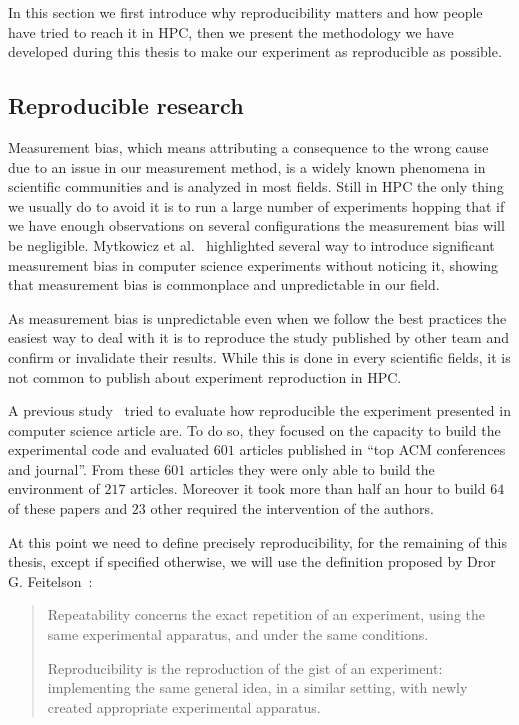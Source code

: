 In this section we first introduce why reproducibility matters and how people have tried to reach it in \gls{HPC}, then we present the methodology we have developed during this thesis to make our experiment as reproducible as possible.


\subsection{Reproducible research}

Measurement bias, which means attributing a consequence to the wrong cause due to an issue in our measurement method, is a widely known phenomena in scientific communities and is analyzed in most fields.
Still in \gls{HPC} the only thing we usually do to avoid it is to run a large number of experiments hopping that if we have enough observations on several configurations the measurement bias will be negligible.
Mytkowicz et al.~\cite{Mytkowicz09Producing} highlighted several way to introduce significant measurement bias in computer science experiments without noticing it, showing that measurement bias is commonplace and unpredictable in our field.

As measurement bias is unpredictable even when we follow the best practices the easiest way to deal with it is to reproduce the study published by other team and confirm or invalidate their results.
While this is done in every scientific fields, it is not common to publish about experiment reproduction in \gls{HPC}.

A previous study~\cite{Collberg15Repeatability} tried to evaluate how reproducible the experiment presented in computer science article are.
To do so, they focused on the capacity to build the experimental code and evaluated $601$ articles published in “top ACM conferences and journal”.
From these $601$ articles they were only able to build the environment of $217$ articles.
Moreover it took more than half an hour to build $64$ of these papers and $23$ other required the intervention of the authors.

At this point we need to define precisely reproducibility, for the remaining
of this thesis, except if specified otherwise, we will use the definition
proposed by Dror G. Feitelson~\cite{Feitelson15From}:

\begin{quote}
    Repeatability concerns the exact repetition of an experiment, using the same experimental apparatus, and under the same conditions.

    Reproducibility is the reproduction of the gist of an experiment: implementing the same general idea, in a similar setting, with newly created appropriate experimental apparatus.
\end{quote}

